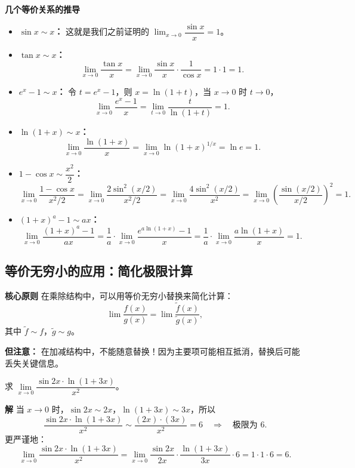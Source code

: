 \documentclass[fontset=fandol]{ctexart}
\newenvironment{custom}[1]{\par\noindent\textbf{#1}\quad}{\par\vspace{0.8em}}
\begin{document}
\begin{custom}{几个等价关系的推导}

\begin{itemize}
\item \textbf{\(\sin x \sim x\)：} 这就是我们之前证明的 \(\lim_{x \to 0} \dfrac{\sin x}{x} = 1\)。

\item \textbf{\(\tan x \sim x\)：} 
\[
\lim_{x \to 0} \dfrac{\tan x}{x} = \lim_{x \to 0} \dfrac{\sin x}{x} \cdot \dfrac{1}{\cos x} = 1 \cdot 1 = 1.
\]

\item \textbf{\(e^x - 1 \sim x\)：} 令 \(t = e^x - 1\)，则 \(x = \ln(1+t)\)，当 \(x \to 0\) 时 \(t \to 0\)，
\[
\lim_{x \to 0} \dfrac{e^x - 1}{x} = \lim_{t \to 0} \dfrac{t}{\ln(1+t)} = 1.
\]

\item \textbf{\(\ln(1+x) \sim x\)：} 
\[
\lim_{x \to 0} \dfrac{\ln(1+x)}{x} = \lim_{x \to 0} \ln(1+x)^{1/x} = \ln e = 1.
\]

\item \textbf{\(1 - \cos x \sim \dfrac{x^2}{2}\)：} 
\[
\lim_{x \to 0} \dfrac{1 - \cos x}{x^2/2} = \lim_{x \to 0} \dfrac{2 \sin^2(x/2)}{x^2/2} = \lim_{x \to 0} \dfrac{4 \sin^2(x/2)}{x^2} = \lim_{x \to 0} \left(\dfrac{\sin(x/2)}{x/2}\right)^2 = 1.
\]

\item \textbf{\((1+x)^a - 1 \sim ax\)：} 
\[
\lim_{x \to 0} \dfrac{(1+x)^a - 1}{ax} = \dfrac{1}{a} \cdot \lim_{x \to 0} \dfrac{e^{a\ln(1+x)} - 1}{x} = \dfrac{1}{a} \cdot \lim_{x \to 0} \dfrac{a\ln(1+x)}{x} = 1.
\]
\end{itemize}
\end{custom}

\subsection{等价无穷小的应用：简化极限计算}

\begin{custom}{核心原则}
在乘除结构中，可以用等价无穷小替换来简化计算：
\[
\lim \dfrac{f(x)}{g(x)} = \lim \dfrac{\tilde{f}(x)}{\tilde{g}(x)},
\]
其中 \(\tilde{f} \sim f\)，\(\tilde{g} \sim g\)。

\textbf{但注意：} 在加减结构中，不能随意替换！因为主要项可能相互抵消，替换后可能丢失关键信息。
\end{custom}

\begin{example}[乘除结构中的替换]
求 \(\lim\limits_{x \to 0} \dfrac{\sin 2x \cdot \ln(1+3x)}{x^2}\)。
\end{example}
\begin{custom}{解}
当 \(x \to 0\) 时，\(\sin 2x \sim 2x\)，\(\ln(1+3x) \sim 3x\)，所以
\[
\dfrac{\sin 2x \cdot \ln(1+3x)}{x^2} \sim \dfrac{(2x) \cdot (3x)}{x^2} = 6 \quad \Rightarrow \quad \text{极限为 } 6.
\]
更严谨地：
\[
\lim_{x \to 0} \dfrac{\sin 2x \cdot \ln(1+3x)}{x^2} = \lim_{x \to 0} \dfrac{\sin 2x}{2x} \cdot \dfrac{\ln(1+3x)}{3x} \cdot 6 = 1 \cdot 1 \cdot 6 = 6.
\]
\end{custom}
\end{document}
